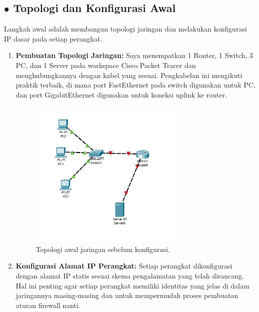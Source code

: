\subsection*{$\bullet$ Topologi dan Konfigurasi Awal}
Langkah awal adalah membangun topologi jaringan dan melakukan konfigurasi IP dasar pada setiap perangkat.
\begin{enumerate}
    \item \textbf{Pembuatan Topologi Jaringan:} Saya menempatkan 1 Router, 1 Switch, 3 PC, dan 1 Server pada workspace Cisco Packet Tracer dan menghubungkannya dengan kabel yang sesuai. Pengkabelan ini mengikuti praktik terbaik, di mana port FastEthernet pada switch digunakan untuk PC, dan port GigabitEthernet digunakan untuk koneksi uplink ke router.
    \begin{figure}[H]
        \centering
        \includegraphics[width=0.7\textwidth]{img4/topoawal.jpeg}
        \caption{Topologi awal jaringan sebelum konfigurasi.}
    \end{figure}
    
    \item \textbf{Konfigurasi Alamat IP Perangkat:} Setiap perangkat dikonfigurasi dengan alamat IP statis sesuai skema pengalamatan yang telah dirancang. Hal ini penting agar setiap perangkat memiliki identitas yang jelas di dalam jaringannya masing-masing dan untuk mempermudah proses pembuatan aturan firewall nanti.
    

\end{enumerate}
